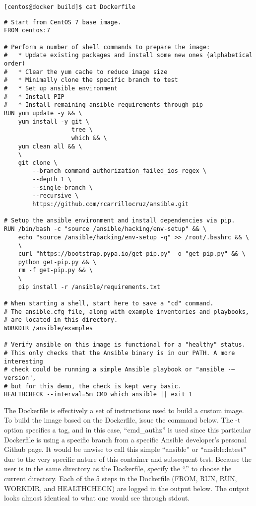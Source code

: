 \begin{verbatim}
[centos@docker build]$ cat Dockerfile
\end{verbatim}

\begin{verbatim}
# Start from CentOS 7 base image.
FROM centos:7

# Perform a number of shell commands to prepare the image:
#   * Update existing packages and install some new ones (alphabetical order)
#   * Clear the yum cache to reduce image size
#   * Minimally clone the specific branch to test
#   * Set up ansible environment
#   * Install PIP
#   * Install remaining ansible requirements through pip
RUN yum update -y && \
    yum install -y git \
                   tree \
                   which && \
    yum clean all && \
    \
    git clone \
        --branch command_authorization_failed_ios_regex \
        --depth 1 \
        --single-branch \
        --recursive \
        https://github.com/rcarrillocruz/ansible.git

# Setup the ansible environment and install dependencies via pip.
RUN /bin/bash -c "source /ansible/hacking/env-setup" && \
    echo "source /ansible/hacking/env-setup -q" >> /root/.bashrc && \
    \
    curl "https://bootstrap.pypa.io/get-pip.py" -o "get-pip.py" && \
    python get-pip.py && \
    rm -f get-pip.py && \
    \
    pip install -r /ansible/requirements.txt

# When starting a shell, start here to save a "cd" command.
# The ansible.cfg file, along with example inventories and playbooks,
# are located in this directory.
WORKDIR /ansible/examples

# Verify ansible on this image is functional for a "healthy" status.
# This only checks that the Ansible binary is in our PATH. A more interesting
# check could be running a simple Ansible playbook or "ansible -–version",
# but for this demo, the check is kept very basic.
HEALTHCHECK --interval=5m CMD which ansible || exit 1
\end{verbatim}

The Dockerfile is effectively a set of instructions used to build a custom
image. To build the image based on the Dockerfile, issue the command below.
The -t option specifies a tag, and in this case, ``cmd\_authz'' is used since
this particular Dockerfile is using a specific branch from a specific Ansible
developer's personal Github page. It would be unwise to call this simple
``ansible'' or ``ansible:latest'' due to the very specific nature of this
container and subsequent test. Because the user is in the same directory as
the Dockerfile, specify the ``.'' to choose the current directory. Each of the 5
steps in the Dockerfile (FROM, RUN, RUN, WORKDIR, and HEALTHCHECK) are logged
in the output below. The output looks almost identical to what one would see
through stdout.


